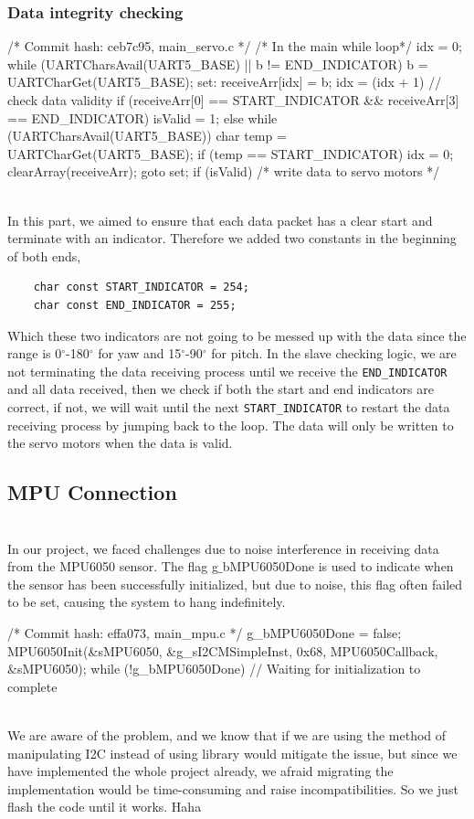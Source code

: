 \documentclass[12pt, a4paper]{article}
\begin{document}
\subsubsection{Data integrity checking}\text{}
\begin{code}
/* Commit hash: ceb7c95, main_servo.c */
/* In the main while loop*/
idx = 0;
while (UARTCharsAvail(UART5_BASE) || b != END_INDICATOR) {
    b = UARTCharGet(UART5_BASE);
set:
    receiveArr[idx] = b;
    idx = (idx + 1) %
}
// check data validity
if (receiveArr[0] == START_INDICATOR && receiveArr[3] == END_INDICATOR)
    isValid = 1;
else {
    while (UARTCharsAvail(UART5_BASE)) {
        char temp = UARTCharGet(UART5_BASE);
        if (temp == START_INDICATOR) {
            idx = 0;
            clearArray(receiveArr);
            goto set;
        }
    }
}
if (isValid) {
    /* write data to servo motors */
}
\end{code}
\text{}\\
In this part, we aimed to ensure that each data packet has a clear start and terminate with an indicator.
Therefore we added two constants in the beginning of both ends, 
\begin{verbatim}
    char const START_INDICATOR = 254;
    char const END_INDICATOR = 255;
\end{verbatim}
Which these two indicators are not going to be messed up with the data since the range is 0$^\circ$-180$^\circ$ for yaw and 15$^\circ$-90$^\circ$ for pitch.
In the slave checking logic, we are not terminating the data receiving process until we receive the \texttt{END\_INDICATOR} and all data received, 
then we check if both the start and end indicators are correct, if not, we will wait until the next \texttt{START\_INDICATOR} to restart the data 
receiving process by jumping back to the loop. The data will only be written to the servo motors when the data is valid.

\subsection{MPU Connection}
\text{}\\
In our project, we faced challenges due to noise interference in receiving data from the MPU6050 sensor. 
The flag g$\_$bMPU6050Done is used to indicate when the sensor has been successfully initialized, 
but due to noise, this flag often failed to be set, causing the system to hang indefinitely. 
\begin{code}
/* Commit hash: effa073, main_mpu.c */
g_bMPU6050Done = false;
MPU6050Init(&sMPU6050, &g_sI2CMSimpleInst, 0x68, MPU6050Callback, &sMPU6050);
while (!g_bMPU6050Done) {
    // Waiting for initialization to complete
}
\end{code}\text{}\\
We are aware of the problem, and we know that if we are using the method of manipulating I2C instead of using library would mitigate the issue, 
but since we have implemented the whole project already, we afraid migrating the implementation would be time-consuming and raise incompatibilities.
So we just flash the code until it works. Haha
\end{document}
